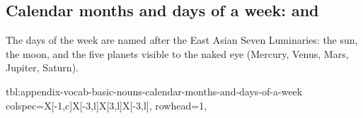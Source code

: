 \documentclass[../nihongo-gakushuu-kyouzai-supplementary.tex]{subfiles}
\begin{document}
\subsection{Calendar months and days of a week:  and }
The days of the week are named after the East Asian Seven Luminaries: the sun, the moon, and the five planets visible to the naked eye (Mercury, Venus, Mars, Jupiter, Saturn).

{tbl:appendix-vocab-basic-nouns-calendar-months-and-days-of-a-week}  %
{
    colspec={X[-1,c]X[-3,l]X[3,l]X[-3,l]},
    rowhead=1,
}  %
\end{document}
